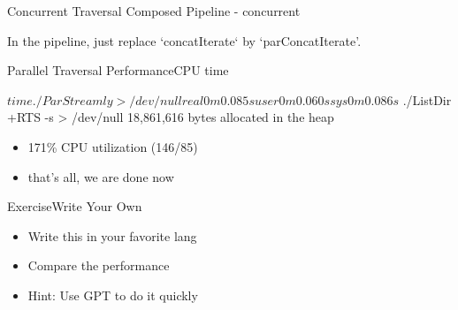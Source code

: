 \documentclass[17pt]{beamer}
\begin{document}
\begin{frame}[fragile]{Concurrent Traversal}
{Composed Pipeline - concurrent}


In the pipeline, just replace `concatIterate` by `parConcatIterate'.
\end{frame}

\begin{frame}[fragile]{Parallel Traversal Performance}{CPU time}

\begin{code}
$ time ./ParStreamly > /dev/null
real    0m0.085s
user    0m0.060s
sys     0m0.086s

$ ./ListDir +RTS -s > /dev/null
      18,861,616 bytes allocated in the heap
\end{code}

\begin{itemize}
\item 171\% CPU utilization (146/85)
\item that's all, we are done now
\end{itemize}
\end{frame}

\begin{frame}{Exercise}{Write Your Own}
\begin{itemize}
  \item Write this in your favorite lang
  \item Compare the performance
  \item Hint: Use GPT to do it quickly
\end{itemize}
\end{frame}
\end{document}
